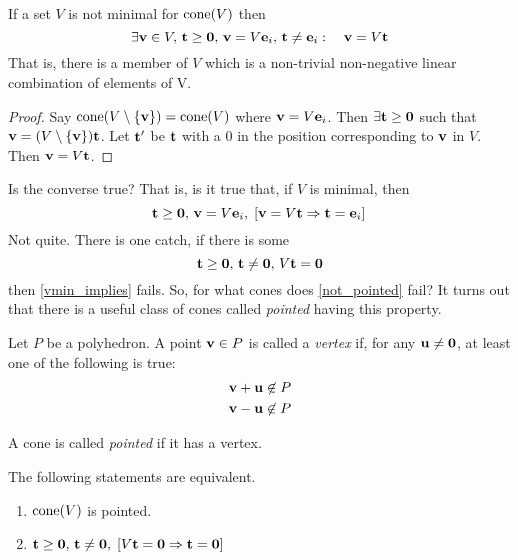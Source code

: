 \begin{Prop}\label{v_not_minimal}
	If a set $V$ is not minimal for $\operatorname{cone}(V)$ then
	\[\exists \mathbf{v}\in V,\, \mathbf{t}\geq\mathbf{0},\, \mathbf{v}=V\mathbf{e}_i,\,\mathbf{t}\neq\mathbf{e}_i:\quad \mathbf{v} = V\mathbf{t} \]
	That is, there is a member of $V$ which is a non-trivial non-negative linear combination of elements of V.
\end{Prop}

\begin{proof}
	Say $\operatorname{cone}(V\setminus\{\mathbf{v}\}) = \operatorname{cone}(V)$ where $\mathbf{v}=V\mathbf{e}_i$.  Then $\exists \mathbf{t}\geq\mathbf{0}$ such that $\mathbf{v}=(V\setminus\{\mathbf{v}\})\mathbf{t}$.  Let $\mathbf{t}'$ be $\mathbf{t}$ with a $0$ in the position corresponding to $\mathbf{v}$ in $V$.  Then $\mathbf{v}=V\mathbf{t}$.
\end{proof}

Is the converse true?  That is, is it true that, if $V$ is minimal, then
\begin{equation}
	\mathbf{t}\geq\mathbf{0},\,\mathbf{v}=V\mathbf{e}_i,\; [\mathbf{v}=V\mathbf{t} \Rightarrow \mathbf{t}=\mathbf{e}_i]\, \label{vmin_implies}
\end{equation}
Not quite.  There is one catch, if there is some
\begin{equation}
	\mathbf{t}\geq\mathbf{0},\,\mathbf{t}\neq\mathbf{0},\,V\mathbf{t}=\mathbf{0}  \label{not_pointed}
\end{equation}
then \eqref{vmin_implies} fails.  So, for what cones does \eqref{not_pointed} fail?  It turns out that there is a useful class of cones called \textit{pointed} having this property.

\begin{Def}[Vertex]
	Let $P$ be a polyhedron.  A point $\mathbf{v} \in P$ is called a \textit{vertex} if, for any $\mathbf{u} \neq \mathbf{0}$, at least one of the following is true:
	\begin{align*}
		\mathbf{v} + \mathbf{u} \not\in P \\
		\mathbf{v} - \mathbf{u} \not\in P
	\end{align*}
\end{Def}

\begin{Def}
	A cone is called \textit{pointed} if it has a vertex.
\end{Def}

\begin{Prop} \label{v_is_pointed} The following statements are equivalent.
	\begin{enumerate}
		\item $\operatorname{cone}(V)$ is pointed.
		\item $\mathbf{t}\geq\mathbf{0},\,\mathbf{t}\neq\mathbf{0},\; [V\mathbf{t}=\mathbf{0} \Rightarrow \mathbf{t}=\mathbf{0}]$
	\end{enumerate}
\end{Prop}

